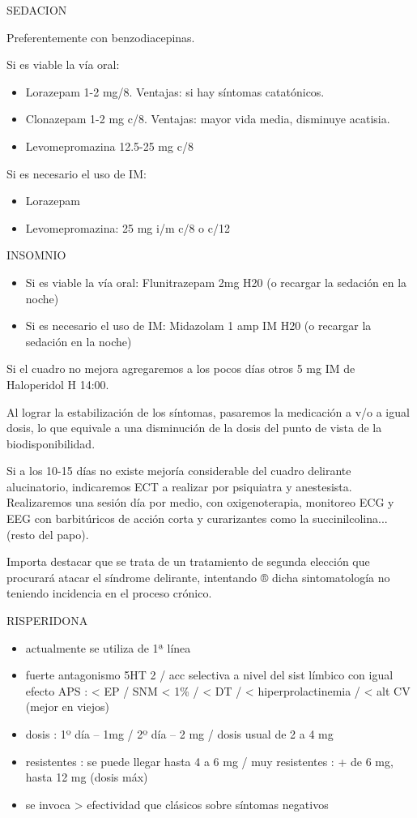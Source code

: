 SEDACION

Preferentemente con benzodiacepinas.

Si es viable la vía oral:
\begin{itemize}
 \item Lorazepam 1-2 mg/8. Ventajas: si hay síntomas catatónicos.
 \item Clonazepam 1-2 mg c/8. Ventajas: mayor vida media, disminuye acatisia.
 \item Levomepromazina 12.5-25 mg c/8
\end{itemize}

Si es necesario el uso de IM:
\begin{itemize}
 \item Lorazepam
 \item Levomepromazina: 25 mg i/m c/8 o c/12
\end{itemize}

INSOMNIO
\begin{itemize}
 \item Si es viable la vía oral: Flunitrazepam 2mg H20 (o recargar la sedación en la noche)
 \item Si es necesario el uso de IM: Midazolam 1 amp IM H20 (o recargar la sedación en la noche)
\end{itemize}

Si el cuadro no mejora agregaremos a los pocos días otros 5 mg IM de Haloperidol H 14:00.

Al lograr la estabilización de los síntomas, pasaremos la medicación a v/o a igual dosis, lo que equivale a una disminución de la dosis del punto de vista de la biodisponibilidad.

Si a los 10-15 días no existe mejoría considerable del cuadro delirante alucinatorio, indicaremos ECT a realizar por psiquiatra y anestesista. Realizaremos una sesión día por medio, con oxigenoterapia, monitoreo ECG y EEG con barbitúricos de acción corta y curarizantes como la succinilcolina... (resto del papo).

Importa destacar que se trata de un tratamiento de segunda elección que procurará atacar el síndrome delirante, intentando ® dicha sintomatología no teniendo incidencia en el proceso crónico.

\faPills RISPERIDONA
\begin{itemize}
    \item actualmente se utiliza de 1ª línea
    \item fuerte antagonismo 5HT 2 / acc selectiva a nivel del sist límbico con igual efecto APS : < EP / SNM < 1\% / < DT / < hiperprolactinemia / < alt CV (mejor en viejos)
    \item dosis : 1º día – 1mg / 2º día – 2 mg / dosis usual de 2 a 4 mg
    \item resistentes : se puede llegar hasta 4 a 6 mg / muy resistentes : + de 6 mg, hasta 12 mg (dosis máx)
    \item se invoca > efectividad que clásicos sobre síntomas negativos
\end{itemize}

